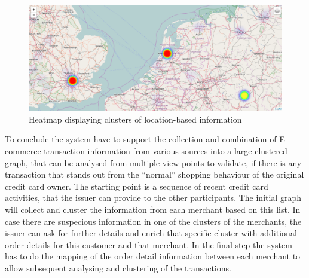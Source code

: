 \begin{figure}[H]
  \centering
  \includegraphics[width=0.9\columnwidth]{images/Heatmap.png}
  \caption{Heatmap displaying clusters of location-based information}
\label{fig:images_map_heatmap}
\end{figure}

To conclude the system have to support the collection and combination of \gls{E-commerce} transaction information from various sources into a large clustered graph, that can be analysed from multiple view points to validate, if there is any transaction that stands out from the ``normal'' shopping behaviour of the original credit card owner. The starting point is a sequence of recent credit card activities, that the issuer can provide to the other participants. The initial graph will collect and cluster the information from each merchant based on this list. In case there are suspecious information in one of the clusters of the merchants, the issuer can ask for further details and enrich that specific cluster with additional order details for this customer and that merchant. In the final step the system has to do the mapping of the order detail information between each merchant to allow subsequent analysing and clustering of the transactions.

